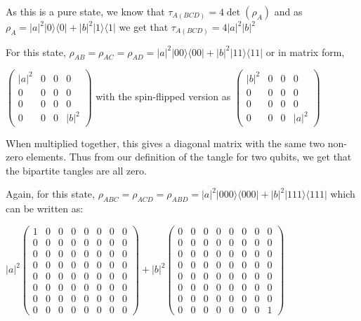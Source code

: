 \documentclass[12pt,a4paper]{article}
\numberwithin{equation}{section}
\begin{document}
As this is a pure state, we know that $\tau_{A(BCD)} = 4\det(\rho_{A})$ and as $\rho_{A} = |a|^2|0\rangle\langle0| + |b|^2|1\rangle\langle1|$ we get that $\tau_{A(BCD)} = 4|a|^2|b|^2$

For this state, $\rho_{AB} = \rho_{AC} = \rho_{AD} = |a|^2|00\rangle\langle00| + |b|^2|11\rangle\langle11|$ or in matrix form,

$\begin{pmatrix} |a|^2 & 0 & 0 & 0 \\ 0 & 0 & 0 & 0 \\ 0 & 0 & 0 & 0 \\ 0 & 0 & 0 & |b|^2 \end{pmatrix}$ with the spin-flipped version as $\begin{pmatrix} |b|^2 & 0 & 0 & 0 \\ 0 & 0 & 0 & 0 \\ 0 & 0 & 0 & 0 \\ 0 & 0 & 0 & |a|^2 \end{pmatrix}$

When multiplied together, this gives a diagonal matrix with the same two non-zero elements. Thus from our definition of the tangle for two qubits, we get that the bipartite tangles are all zero.

Again, for this state, $\rho_{ABC} = \rho_{ACD} = \rho_{ABD} = |a|^2|000\rangle\langle000| + |b|^2|111\rangle\langle111|$ which can be written as:

$|a|^2 \begin{pmatrix} 1 & 0 & 0 & 0 & 0 & 0 & 0 & 0 \\ 0 & 0 & 0 & 0 & 0 & 0 & 0 & 0 \\ 0 & 0 & 0 & 0 & 0 & 0 & 0 & 0 \\ 0 & 0 & 0 & 0 & 0 & 0 & 0 & 0 \\ 0 & 0 & 0 & 0 & 0 & 0 & 0 & 0 \\ 0 & 0 & 0 & 0 & 0 & 0 & 0 & 0 \\ 0 & 0 & 0 & 0 & 0 & 0 & 0 & 0 \\ 0 & 0 & 0 & 0 & 0 & 0 & 0 & 0 \end{pmatrix} + |b|^2 \begin{pmatrix} 0 & 0 & 0 & 0 & 0 & 0 & 0 & 0 \\ 0 & 0 & 0 & 0 & 0 & 0 & 0 & 0 \\ 0 & 0 & 0 & 0 & 0 & 0 & 0 & 0 \\ 0 & 0 & 0 & 0 & 0 & 0 & 0 & 0 \\ 0 & 0 & 0 & 0 & 0 & 0 & 0 & 0 \\ 0 & 0 & 0 & 0 & 0 & 0 & 0 & 0 \\ 0 & 0 & 0 & 0 & 0 & 0 & 0 & 0 \\ 0 & 0 & 0 & 0 & 0 & 0 & 0 & 1 \end{pmatrix}$
\end{document}
